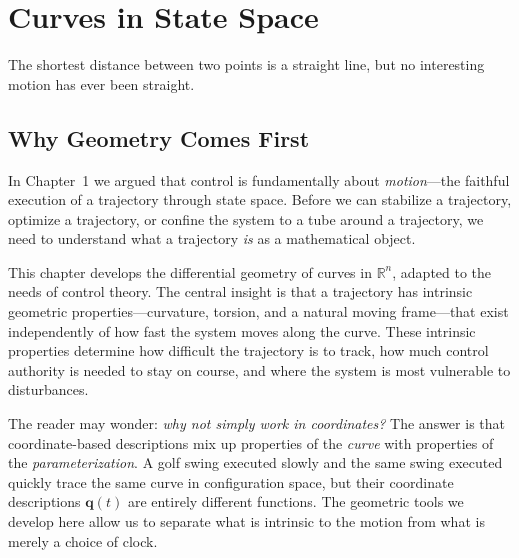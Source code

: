 \documentclass[12pt, openany]{book}
\theoremstyle{plain}
\newcommand{\Reals}{\mathbb{R}}
\begin{document}
\setcounter{chapter}{1}

\chapter{Curves in State Space}

\epigraph{%
  The shortest distance between two points is a straight line,
  but no interesting motion has ever been straight.
}{}

\vspace{0.5cm}

\section{Why Geometry Comes First}

In Chapter~1 we argued that control is fundamentally about \emph{motion}---the
faithful execution of a trajectory through state space. Before we can stabilize
a trajectory, optimize a trajectory, or confine the system to a tube around a
trajectory, we need to understand what a trajectory \emph{is} as a mathematical
object.

This chapter develops the differential geometry of curves in $\Reals^n$, adapted
to the needs of control theory. The central insight is that a trajectory has
intrinsic geometric properties---curvature, torsion, and a natural moving
frame---that exist independently of how fast the system moves along the curve.
These intrinsic properties determine how difficult the trajectory is to track,
how much control authority is needed to stay on course, and where the system
is most vulnerable to disturbances.

The reader may wonder: \emph{why not simply work in coordinates?} The answer is
that coordinate-based descriptions mix up properties of the \emph{curve} with
properties of the \emph{parameterization}. A golf swing executed slowly and the
same swing executed quickly trace the same curve in configuration space, but
their coordinate descriptions $\bm{q}(t)$ are entirely different functions. The
geometric tools we develop here allow us to separate what is intrinsic to the
motion from what is merely a choice of clock.
\end{document}
